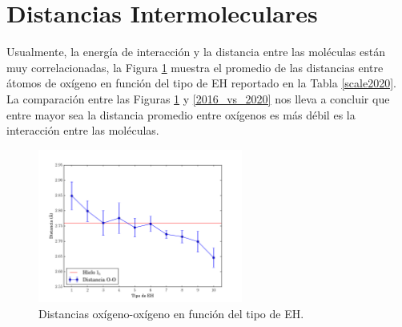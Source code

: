%
%
%
%
\section{Distancias Intermoleculares}
%
Usualmente, la energía de interacción y la distancia entre las moléculas están
muy correlacionadas, la Figura \ref{Distances_O-O_new_scale} muestra el
promedio de las distancias entre átomos de oxígeno en función del tipo de EH
reportado en la Tabla \ref{scale2020}. La comparación entre las Figuras
\ref{Distances_O-O_new_scale} y \ref{2016_vs_2020} nos lleva a concluir que
entre mayor sea la distancia promedio entre oxígenos es más débil es la
interacción entre las moléculas.

\begin{figure}
    \centering
    \includegraphics[width=0.60\textwidth]{4/img/Distances_O-O_new_scale}
    \caption{Distancias oxígeno-oxígeno en función del tipo de EH.}
\label{Distances_O-O_new_scale}
\end{figure}

